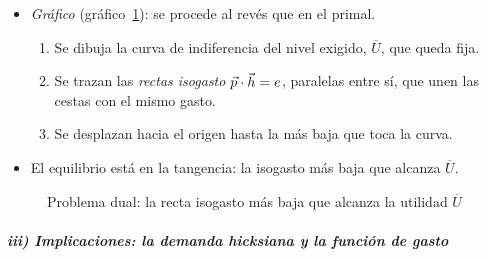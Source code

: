 \documentclass[11pt]{article}
\begin{document}
\begin{itemize}
\begin{itemize}
  \item La restricción se satura, $U(\vect{h}^*)=\overline{U}$, por la continuidad de $U$: si sobrara utilidad, podría reducirse un poco la cantidad de algún bien comprado y gastar menos sin bajar de $\overline{U}$\nocite{MasColellWhinstonGreen1995}. Con preferencias estrictamente convexas se cumplen las condiciones de segundo orden, que son las mismas que en el primal (anexo~\ref{anexo:kt}).
  \end{itemize}
\item \emph{Gráfico} (gráfico~\ref{fig:dual}): se procede al revés que en el primal.
  \begin{enumerate}
  \item Se dibuja la curva de indiferencia del nivel exigido, $\overline{U}$, que queda fija.
  \item Se trazan las \emph{rectas isogasto} $\vec{p}\cdot\vec{h}=e$, paralelas entre sí, que unen las cestas con el mismo gasto.
  \item Se desplazan hacia el origen hasta la más baja que toca la curva.
  \end{enumerate}
\item El equilibrio está en la tangencia: la isogasto más baja que alcanza $\overline{U}$.
\end{itemize}

\begin{figure}[H]
\centering
\caption{Problema dual: la recta isogasto más baja que alcanza la utilidad $\overline{U}$}\label{fig:dual}
\end{figure}

\subparagraph{iii) Implicaciones: la demanda hicksiana y la función de gasto}
\end{document}
